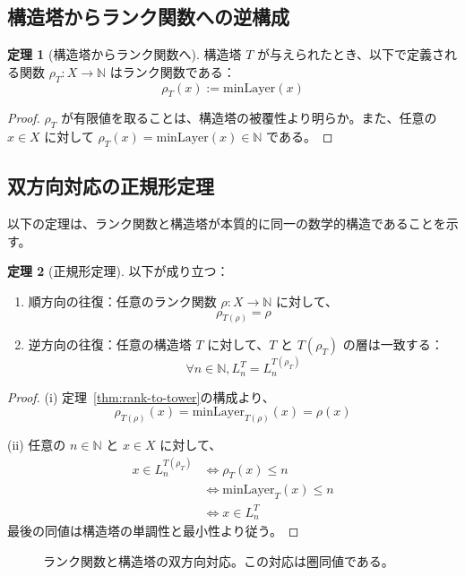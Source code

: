 \documentclass[a4paper,11pt]{ltjsarticle}
\theoremstyle{definition}
\newtheorem{theorem}{定理}[section]
\newcommand{\N}{\mathbb{N}}
\begin{document}
\subsection{構造塔からランク関数への逆構成}

\begin{theorem}[構造塔からランク関数へ]\label{thm:tower-to-rank}
構造塔 $T$ が与えられたとき、以下で定義される関数 $\rho_T : X \to \N$ はランク関数である：
\[
\rho_T(x) := \mathrm{minLayer}(x)
\]
\end{theorem}

\begin{proof}
$\rho_T$ が有限値を取ることは、構造塔の被覆性より明らか。また、任意の $x \in X$ に対して $\rho_T(x) = \mathrm{minLayer}(x) \in \N$ である。
\end{proof}

\subsection{双方向対応の正規形定理}

以下の定理は、ランク関数と構造塔が本質的に同一の数学的構造であることを示す。

\begin{theorem}[正規形定理]\label{thm:normal-form}
以下が成り立つ：
\begin{enumerate}[label=(\roman*)]
\item 順方向の往復：任意のランク関数 $\rho : X \to \N$ に対して、
\[
\rho_{T(\rho)} = \rho
\]
\item 逆方向の往復：任意の構造塔 $T$ に対して、$T$ と $T(\rho_T)$ の層は一致する：
\[
\forall n \in \N, L_n^T = L_n^{T(\rho_T)}
\]
\end{enumerate}
\end{theorem}

\begin{proof}
(i) 定理~\ref{thm:rank-to-tower}の構成より、
\[
\rho_{T(\rho)}(x) = \mathrm{minLayer}_{T(\rho)}(x) = \rho(x)
\]

(ii) 任意の $n \in \N$ と $x \in X$ に対して、
\begin{align*}
x \in L_n^{T(\rho_T)} &\Leftrightarrow \rho_T(x) \leq n \\
&\Leftrightarrow \mathrm{minLayer}_T(x) \leq n \\
&\Leftrightarrow x \in L_n^T
\end{align*}
最後の同値は構造塔の単調性と最小性より従う。
\end{proof}

\begin{figure}[htbp]
\centering
{}
\caption{ランク関数と構造塔の双方向対応。この対応は圏同値である。}
\end{figure}
\end{document}

